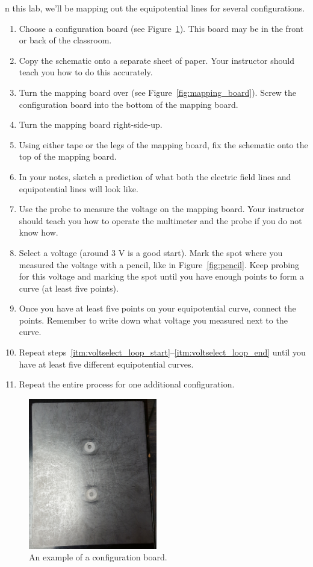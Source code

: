 \documentclass{article}
\begin{document}
n this lab, we'll be mapping out the equipotential lines for several configurations.
\begin{enumerate}
	\item{Choose a configuration board (see Figure~\ref{fig:config_board}). This board may be in the front or back of the classroom.}
	\item{Copy the schematic onto a separate sheet of paper. Your instructor should teach you how to do this accurately.}
	\item{Turn the mapping board over (see Figure~\ref{fig:mapping_board}). Screw the configuration board into the bottom of the mapping board.}
	\item{Turn the mapping board right-side-up.}
	\item{Using either tape or the legs of the mapping board, fix the schematic onto the top of the mapping board.}
	\item{In your notes, sketch a prediction of what both the electric field lines and equipotential lines will look like.}
	\item{Use the probe to measure the voltage on the mapping board. Your instructor should teach you how to operate the multimeter and the probe if you do not know how.}
	\item{Select a voltage (around 3 V is a good start). Mark the spot where you measured the voltage with a pencil, like in Figure~\ref{fig:pencil}. Keep probing for this voltage and marking the spot until you have enough points to form a curve (at least five points).\label{itm:voltselect_loop_start}}
	\item{Once you have at least five points on your equipotential curve, connect the points. Remember to write down what voltage you measured next to the curve.\label{itm:voltselect_loop_end}}
	\item{Repeat steps~\ref{itm:voltselect_loop_start}--\ref{itm:voltselect_loop_end} until you have at least five different equipotential curves.}
	\item{Repeat the entire process for one additional configuration.}
\end{enumerate}

\begin{figure}[hbt!]
	\begin{center}
		\includegraphics[width=0.5\textwidth]{config_board}
		\caption{An example of a configuration board.}
		\label{fig:config_board}
	\end{center}
\end{figure}
\end{document}
